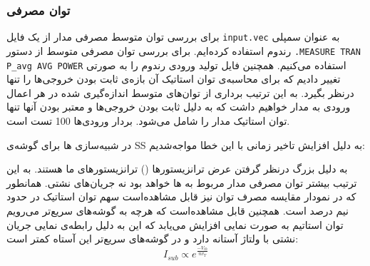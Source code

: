 \subsubsection{توان مصرفی}
برای بررسی توان متوسط مصرفی مدار از یک فایل \texttt{input.vec} به عنوان سمپلی رندوم استفاده کرده‌ایم.
برای بررسی توان مصرفی متوسط از دستور \texttt{.MEASURE TRAN P\_avg AVG POWER} استفاده می‌کنیم.
همچنین فایل تولید ورودی رندوم را به صورتی تغییر دادیم که برای محاسبه‌ی توان استاتیک آن بازه‌ی ثابت بودن خروجی‌ها را تنها درنظر بگیرد.
به این ترتیب برداری از توان‌های متوسط اندازه‌گیری شده در هر اعمال ورودی به مدار خواهیم داشت که به دلیل ثابت بودن خروجی‌ها و معتبر بودن آنها تنها توان استاتیک مدار را شامل می‌شود.
بردار ورودی‌ها 100 تست است.

در شبیه‌سازی ها برای گوشه‌ی SS به دلیل افزایش تاخیر زمانی با این خطا مواجه‌شدیم:


به دلیل بزرگ درنظر گرفتن عرض ترانزیستور‌ها () ترانزیستور‌های ما  هستند.
به این ترتیب بیشتر توان مصرفی مدار مربوط به ها خواهد بود نه جریان‌های نشتی.
همانطور که در نمودار‌ مقایسه مصرف‌ توان نیز قابل مشاهده‌است سهم توان استاتیک در حدود نیم درصد است.
همچنین قابل مشاهده‌است که هرچه به گوشه‌های سریع‌تر می‌رویم توان استاتیم به صورت نمایی افزایش می‌یابد که این به دلیل رابطه‌ی نمایی جریان نشتی با
ولتاژ آستانه دارد و در گوشه‌های سریع‌تر این آستاه کمتر است:
$$I_{sub} \propto e^{\frac{-V_{th}}{n v_T}}$$




